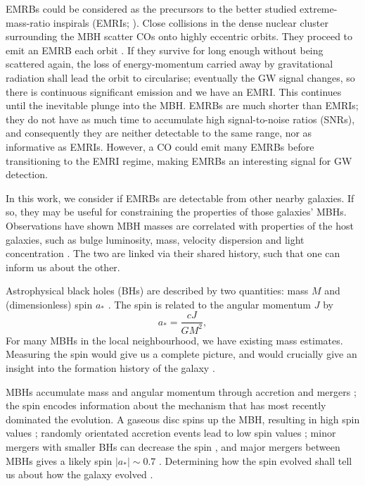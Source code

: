 \documentclass[useAMS,usedcolumn,usegraphicx,usenatbib]{mn2e}
\begin{document}
EMRBs could be considered as the precursors to the better studied extreme-mass-ratio inspirals (EMRIs; \citealt{Amaro-Seoane2007}). Close collisions in the dense nuclear cluster surrounding the MBH scatter COs onto highly eccentric orbits. They proceed to emit an EMRB each orbit \citep*{Rubbo2006}. If they survive for long enough without being scattered again, the loss of energy-momentum carried away by gravitational radiation shall lead the orbit to circularise; eventually the GW signal changes, so there is continuous significant emission and we have an EMRI. This continues until the inevitable plunge into the MBH. EMRBs are much shorter than EMRIs; they do not have as much time to accumulate high signal-to-noise ratios (SNRs), and consequently they are neither detectable to the same range, nor as informative as EMRIs. However, a CO could emit many EMRBs before transitioning to the EMRI regime, making EMRBs an interesting signal for GW detection.

In this work, we consider if EMRBs are detectable from other nearby galaxies. If so, they may be useful for constraining the properties of those galaxies' MBHs. Observations have shown MBH masses are correlated with properties of the host galaxies, such as bulge luminosity, mass, velocity dispersion and light concentration \citep[e.g.,][]{Kormendy1995, Magorrian1998, Graham2011}. The two are linked via their shared history, such that one can inform us about the other.

Astrophysical black holes (BHs) are described by two quantities: mass $M$ and (dimensionless) spin $a_\ast$ \citep{Chandrasekhar1998}. The spin is related to the angular momentum $J$ by
\begin{equation}
a_\ast = \frac{cJ}{GM^2},
\end{equation}
For many MBHs in the local neighbourhood, we have existing mass estimates. Measuring the spin would give us a complete picture, and would crucially give an insight into the formation history of the galaxy \citep{Dotti2013,Volonteri2012a}.

MBHs accumulate mass and angular momentum through accretion and mergers \citep{Volonteri2010, Yu2002}; the spin encodes information about the mechanism that has most recently dominated the evolution. A gaseous disc spins up the MBH, resulting in high spin values \citep{Volonteri2005}; randomly orientated accretion events lead to low spin values \citep*{King2006, King2008}; minor mergers with smaller BHs can decrease the spin \citep*{Hughes2003, Gammie2004}, and major mergers between MBHs gives a likely spin $|a_\ast| \sim 0.7$ \citep{Berti2008, Gonzalez2007}. Determining how the spin evolved shall tell us about how the galaxy evolved \citep{Barausse2012}.
\end{document}
